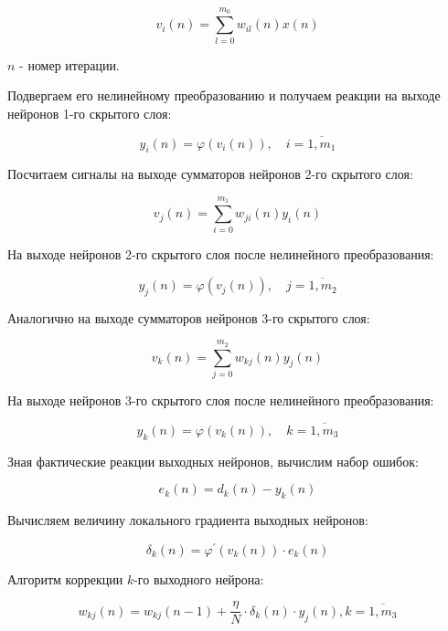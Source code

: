 \documentclass{article}
\numberwithin{equation}{subsection}
\begin{document}
\begin{equation}
    v_i (n) = \sum_{l=0}^{m_{0}} w_{il}(n) x(n)
\end{equation}

\noindent
$n$ - номер итерации.

Подвергаем его нелинейному преобразованию и получаем реакции на выходе нейронов 1-го скрытого слоя:

\begin{equation}
    y_i(n) = \varphi (v_i(n)), \quad i=\overline{1,m_1}
\end{equation}

Посчитаем сигналы на выходе сумматоров нейронов 2-го скрытого слоя:

\begin{equation}
    v_j (n) = \sum_{i=0}^{m_{1}} w_{ji}(n) y_i(n)
\end{equation}

На выходе нейронов 2-го скрытого слоя после нелинейного преобразования:

\begin{equation}
    y_j(n) = \varphi (v_j(n)), \quad j=\overline{1,m_2}
\end{equation}

Аналогично на выходе сумматоров нейронов 3-го скрытого слоя:

\begin{equation}
    v_k (n) = \sum_{j=0}^{m_{2}} w_{kj}(n) y_j(n)
\end{equation}

На выходе нейронов 3-го скрытого слоя после нелинейного преобразования:

\begin{equation}
    y_k(n) = \varphi (v_k(n)), \quad k=\overline{1,m_3}
\end{equation}

Зная фактические реакции выходных нейронов, вычислим набор ошибок:

\begin{equation}
    e_{k}(n) = d_k(n) - y_k(n)
\end{equation}

Вычисляем величину локального градиента выходных нейронов:

\begin{equation}
    \delta_k(n) = \varphi^{\prime}(v_k(n))\cdot e_k(n)
\end{equation}

Алгоритм коррекции $k$-го выходного нейрона:

\begin{equation}
    w_{kj}(n) = w_{kj}(n-1) + \dfrac{\eta}{N} \cdot \delta_{k}(n) \cdot y_j(n), k=\overline{1,m_3}
\end{equation}
\end{document}
